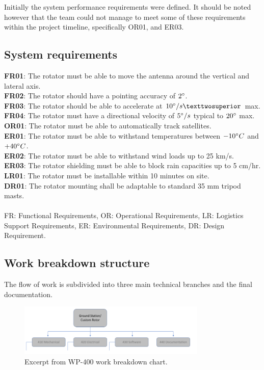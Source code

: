 
Initially the system performance requirements were defined. It should be noted however that the team could not manage to meet some of these requirements within the project timeline, specifically OR01, and ER03.
\subsection{System requirements}
\textbf{FR01}: The rotator must be able to move the antenna around the vertical and lateral axis.\\
\textbf{FR02}: The rotator should have a pointing accuracy of $2\degree$.\\
\textbf{FR03}: The rotator should be able to accelerate at $10\degree/s²$ max.\\
\textbf{FR04}: The rotator must have a directional velocity of $5\degree/s$ typical to $20\degree$ max.\\
\textbf{OR01}: The rotator must be able to automatically track satellites.\\
\textbf{ER01}: The rotator must be able to withstand temperatures between $-10\degree C$ and $+40\degree C$.\\
\textbf{ER02}: The rotator must be able to withstand wind loads up to 25 km/s.\\
\textbf{ER03}: The rotator shielding must be able to block rain capacities up to 5 cm/hr.\\
\textbf{LR01}: The rotator must be installable within 10 minutes on site.\\
\textbf{DR01}: The rotator mounting shall be adaptable to standard 35 mm tripod masts.\\
\\
FR: Functional Requirements, OR: Operational Requirements, LR: Logistics Support Requirements, ER: Environmental Requirements, DR: Design Requirement.

\subsection{Work breakdown structure}
The flow of work is subdivided into three main technical branches and the final documentation.
\begin{figure}[H]
	\centering
	\includegraphics[width=0.8\textwidth]{../art/chart.png}
	\caption{Excerpt from WP-400 work breakdown chart.}
\end{figure}